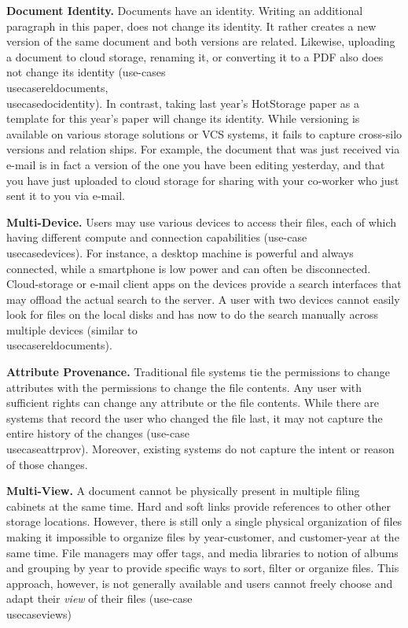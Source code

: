 \noindent\textbf{Document Identity.}
Documents have an identity. Writing an additional paragraph in this paper, does not change its identity. It rather creates a new version of the same document and both versions are related.
Likewise, uploading a document to cloud storage, renaming it, or converting it to a PDF also does not change its identity (use-cases \\usecasereldocuments, \\usecasedocidentity).
In contrast, taking last year's HotStorage paper as a template for this year's paper will change its identity.
While versioning is available on various storage solutions or VCS systems, it fails to capture cross-silo versions and relation ships. For example,
the document that was just received via e-mail is in fact a version of the one you have been editing yesterday, and that you have just uploaded to cloud storage for sharing with your co-worker who just sent it to you via e-mail.

\noindent\textbf{Multi-Device.}
Users may use various devices to access their files, each of which having different compute and connection capabilities (use-case \\usecasedevices).
For instance, a desktop machine is powerful and always connected, while a smartphone is low power and can often be disconnected. Cloud-storage or e-mail client apps on the devices provide a search interfaces that may offload the actual search to the server.
A user with two devices cannot easily look for files on the local disks and has now to do the search manually across multiple devices (similar to \\usecasereldocuments).

\noindent\textbf{Attribute Provenance.}
Traditional file systems tie the permissions to change attributes with the permissions to change the file contents.
Any user with sufficient rights can change any attribute or the file contents.
While there are systems that record the user who changed the file last, it may not capture the entire history of the changes (use-case \\usecaseattrprov).
Moreover, existing systems do not capture the intent or reason of those changes.

\noindent\textbf{Multi-View.}
A document cannot be physically present in multiple filing cabinets at the same time.
Hard and soft links provide references to other other storage locations.
However, there is still only a single physical organization of files making it impossible to organize files by year-customer, and customer-year at the same time.
File managers may offer tags, and media libraries to notion of albums and grouping by year to provide specific ways to sort, filter or organize files.
This approach, however, is not generally available and users cannot freely choose and adapt their \emph{view} of their files (use-case \\usecaseviews)

